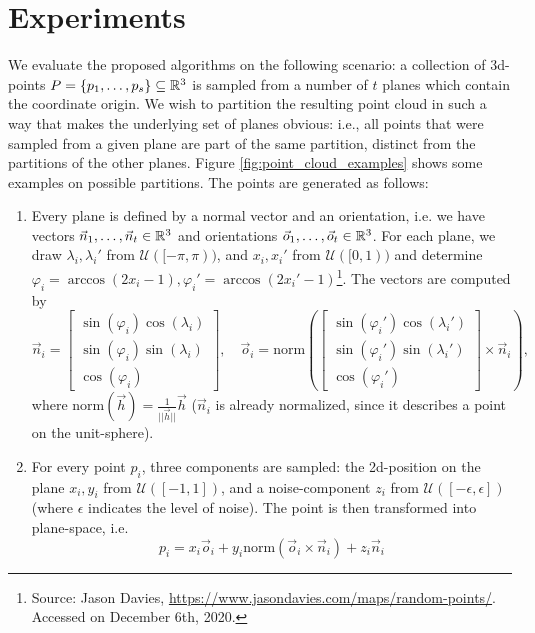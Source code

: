 \section{Experiments}\label{sec:experiments}
We evaluate the proposed algorithms on the following scenario: a collection of 3d-points $P = \{ p_1,\dots,p_s \} \subseteq \mathbb{R}^3$ is sampled from a number of $t$ planes which contain the coordinate origin. We wish to partition the resulting point cloud in such a way that makes the underlying set of planes obvious: i.e., all points that were sampled from a given plane are part of the same partition, distinct from the partitions of the other planes. Figure \ref{fig:point_cloud_examples} shows some examples on possible partitions. The points are generated as follows:
\begin{enumerate}
    \item Every plane is defined by a normal vector and an orientation, i.e. we have vectors $\vec{n}_1,\dots,\vec{n}_t \in \mathbb{R}^3$ and orientations $\vec{o}_1,\dots,\vec{o}_t \in \mathbb{R}^3$. For each plane, we draw $\lambda_i,\lambda_i'$ from $\mathcal{U}([-\pi,\pi))$, and $x_i,x_i'$ from $\mathcal{U}([0,1))$ and determine $\varphi_i = \arccos(2x_i-1), \varphi_i' = \arccos(2x_i'-1)$\footnote{Source: Jason Davies, \href{https://www.jasondavies.com/maps/random-points/}{https://www.jasondavies.com/maps/random-points/}. Accessed on December 6th, 2020.}. The vectors are computed by $$ \vec{n}_i = \begin{bmatrix} \sin(\varphi_i) \cos(\lambda_i) \\ \sin(\varphi_i)\sin(\lambda_i) \\ \cos(\varphi_i) \end{bmatrix},\quad \vec{o}_i = \mathrm{norm} \left( \begin{bmatrix} \sin(\varphi_i') \cos(\lambda_i') \\ \sin(\varphi_i')\sin(\lambda_i') \\ \cos(\varphi_i') \end{bmatrix} \times \vec{n}_i \right), $$ where $\mathrm{norm}(\vec{h})=\frac{1}{||\vec{h}||} \vec{h} $ ($\vec{n}_i$ is already normalized, since it describes a point on the unit-sphere).
    \item For every point $p_i$, three components are sampled: the 2d-position on the plane $x_i,y_i$ from $\mathcal{U}([-1,1])$, and a noise-component $z_i$ from $\mathcal{U}([-\epsilon,\epsilon])$ (where $\epsilon$ indicates the level of noise). The point is then transformed into plane-space, i.e. $$ p_i = x_i \vec{o}_i + y_i \mathrm{norm}(\vec{o}_i \times \vec{n}_i) + z_i \vec{n}_i$$
\end{enumerate}
